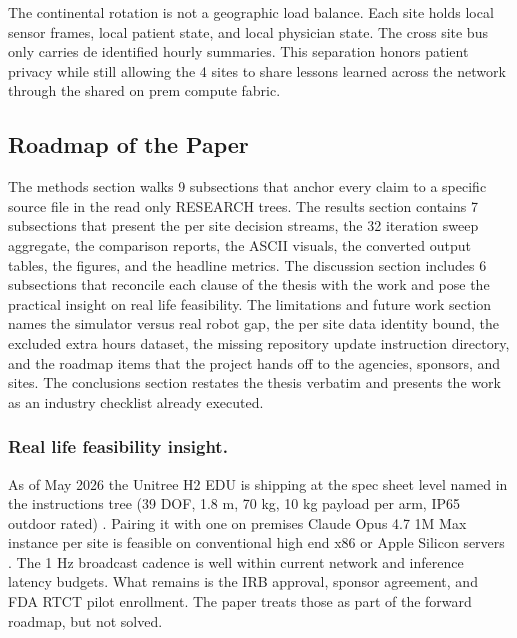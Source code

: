\begin{sectionaccent}
The continental rotation is not a geographic load balance. Each site
holds local sensor frames, local patient state, and local physician
state. The cross site bus only carries de identified hourly
summaries. This separation honors patient privacy while still allowing
the 4 sites to share lessons learned across the network through the
shared on prem compute fabric.

\subsection{Roadmap of the Paper}
\label{sec:intro-roadmap}

The methods section walks 9 subsections that anchor every claim to a
specific source file in the read only RESEARCH trees. The results
section contains 7 subsections that present the per site decision
streams, the 32 iteration sweep aggregate, the comparison reports,
the ASCII visuals, the converted output tables, the figures, and the
headline metrics. The discussion section includes 6 subsections that
reconcile each clause of the thesis with the work and pose the
practical insight on real life feasibility. The limitations and future
work section names the simulator versus real robot gap, the per site
data identity bound, the excluded extra hours dataset, the missing
repository update instruction directory, and the roadmap items that
the project hands off to the agencies, sponsors, and sites. The
conclusions section restates the thesis verbatim and presents the
work as an industry checklist already executed.

\subsubsection*{Real life feasibility insight.} As of May 2026 the
Unitree H2 EDU is shipping at the spec sheet level named in the
instructions tree (39 DOF, 1.8 m, 70 kg, 10 kg payload per arm, IP65
outdoor rated) \cite{unitree_h2_2026}. Pairing it with one on
premises Claude Opus 4.7 1M Max instance per site is feasible on
conventional high end x86 or Apple Silicon servers
\cite{anthropic_claude_opus_47_2026}. The 1 Hz broadcast cadence is
well within current network and inference latency budgets. What
remains is the IRB approval, sponsor agreement, and FDA RTCT
pilot enrollment. The paper treats those as part of the forward
roadmap, but not solved.



\end{sectionaccent}
